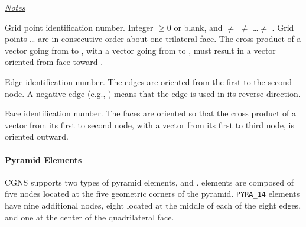 {{{\uline{\textit{Notes}}%
\begin{Ventryi}{}
   \item [\fort{N1,\ldots,N10}]
         Grid point identification number.
         Integer $\ge 0$ or blank, and  $\ne$ 
         $\ne$ \ldots $\ne$ .
         Grid points \ldots{} are in consecutive order about
         one trilateral face.
         The cross product of a vector going from  to ,
         with a vector going from  to , must result in a
         vector oriented from face  toward .
   \item [\fort{E1,\ldots,E6}]
         Edge identification number.
         The edges are oriented from the first to the second node.
         A negative edge (e.g., ) means that the edge is used in
         its reverse direction.
   \item [\fort{F1,\ldots,F4}]
         Face identification number.
         The faces are oriented so that the cross product of a vector
         from its first to second node, with a vector from its first to
         third node, is oriented outward.
\end{Ventryi}

\paragraph{Pyramid Elements}
CGNS supports two types of pyramid elements, 
and .
 elements are composed of five nodes located at the
five geometric corners of the pyramid.
\texttt{PYRA\_14} elements have nine additional nodes, eight located at
the middle of each of the eight edges, and one at the center of the
quadrilateral face.

}}}
